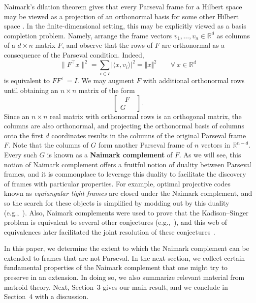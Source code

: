 \documentclass[12pt]{article}
\theoremstyle{plain}
\theoremstyle{definition}
\theoremstyle{remark}
\newcommand{\norm}[1]{\Vert#1\Vert}
\newcommand{\absip}[2]{\vert\langle#1,#2\rangle\vert}
\begin{document}
Naimark's dilation theorem gives that every Parseval frame for a Hilbert space may be viewed as a projection of an orthonormal basis for some other Hilbert space \cite{neumark1943representation,han2000frames}. 
In the finite-dimensional setting, this may be explicitly viewed as a basis completion problem. 
Namely, arrange the frame vectors $v_1,\ldots,v_n\in\mathbb{R}^d$ as columns of a $d\times n$ matrix $F$, and observe that the rows of $F$ are orthonormal as a consequence of the Parseval condition.
Indeed,
\[
\|F^\top x\|^2
= \sum_{i \in I} \absip{x}{v_i}^2 
= \norm{x}^2 
\qquad
\forall~x\in\mathbb{R}^d
\]
is equivalent to $FF^\top = I$.
We may augment $F$ with additional orthonormal rows until obtaining an $n\times n$ matrix of the form
\begin{equation}
\label{eq.completion}
\left[\begin{array}{c}
~~~F~~~\\G\end{array}\right].
\end{equation}
Since an $n \times n$ real matrix with orthonormal rows is an orthogonal matrix, the columns are also orthonormal, and projecting the orthonormal basis of columns onto the first $d$ coordinates results in the columns of the original Parseval frame $F$.
Note that the columns of $G$ form another Parseval frame of $n$ vectors in $\mathbb{R}^{n-d}$.
Every such $G$ is known as a \textbf{Naimark complement} of $F$.
As we will see, this notion of Naimark complement offers a fruitful notion of duality between Parseval frames, and it is commonplace to leverage this duality to facilitate the discovery of frames with particular properties.
For example, optimal projective codes known as \textit{equiangular tight frames} are closed under the Naimark complement, and so the search for these objects is simplified by modding out by this duality (e.g.,\ \cite{holmes2004optimal}).
Also, Naimark complements were used to prove that the Kadison--Singer problem is equivalent to several other conjectures (e.g.,\ \cite[Chapter 11]{casazza2013finite}), and this web of equivalences later facilitated the joint resolution of these conjectures~\cite{marcus2015interlacing}.

In this paper, we determine the extent to which the Naimark complement can be extended to frames that are not Parseval.
In the next section, we collect certain fundamental properties of the Naimark complement that one might try to preserve in an extension.
In doing so, we also summarize relevant material from matroid theory.
Next, Section~3 gives our main result, and we conclude in Section~4 with a discussion.
\end{document}
